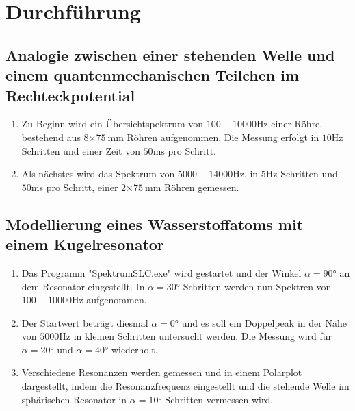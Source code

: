 \section{Durchführung}
\label{sec:Durchführung}

\subsection{Analogie zwischen einer stehenden Welle und einem quantenmechanischen Teilchen im Rechteckpotential}



\begin{enumerate}
\item Zu Beginn wird ein Übersichtspektrum von $100-10000\si{\hertz}$ einer Röhre, bestehend aus 8$\times$$\SI{75}{\milli\meter}$ Röhren aufgenommen. Die Messung erfolgt in $10\si{\hertz}$ Schritten und einer Zeit von $50\si{\milli\second}$ pro Schritt.
\item Als nächstes wird das Spektrum von $5000-14000\si{\hertz}$, in $5\si{\hertz}$ Schritten und $50$ms pro Schritt, einer 2$\times$$\SI{75}{\milli\meter}$ Röhren gemessen.
\end{enumerate}

\subsection{Modellierung eines Wasserstoffatoms mit einem Kugelresonator}

\begin{enumerate}
\item Das Programm "SpektrumSLC.exe" wird gestartet und der Winkel $\alpha=90$° an dem Resonator eingestellt. In  $\alpha=30$° Schritten werden nun Spektren von $100-10000\si{\hertz}$ aufgenommen.
\item Der Startwert beträgt diesmal $\alpha=0$° und es soll ein Doppelpeak in der Nähe von $5000\si{\hertz}$ in kleinen Schritten untersucht werden. Die Messung wird für $\alpha=20$° und $\alpha=40$° wiederholt.
\item Verschiedene Resonanzen werden gemessen und in einem Polarplot dargestellt, indem die Resonanzfrequenz eingestellt und die stehende Welle im sphärischen Resonator in $\alpha=10$° Schritten vermessen wird.
\end{enumerate}

